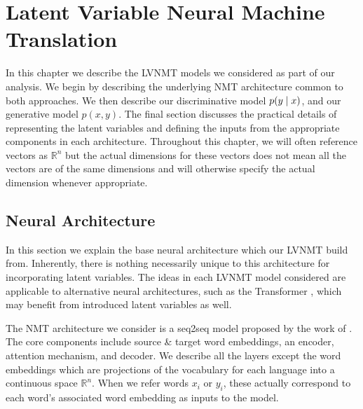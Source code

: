 \chapter{Latent Variable Neural Machine Translation}

In this chapter we describe the \ac{LVNMT} models we considered as part of our analysis. We begin by describing the underlying \ac{NMT} architecture common to both approaches. We then describe our discriminative model $p(y \; | \;{x})$, and our generative model $p(x, y)$. The final section discusses the practical details of representing the latent variables and defining the inputs from the appropriate components in each architecture. Throughout this chapter, we will often reference vectors as $\mathbb{R}^{n}$ but the actual dimensions for these vectors does not mean all the vectors are of the same dimensions and will otherwise specify the actual dimension whenever appropriate. 


\section{Neural Architecture}

In this section we explain the base neural architecture which our \ac{LVNMT} build from. Inherently, there is nothing necessarily unique to this architecture for incorporating latent variables.  The ideas in each \ac{LVNMT} model considered are applicable to alternative neural architectures, such as the Transformer \cite{vaswani2017attentionTransformer}, which may benefit from introduced latent variables as well. 

The \ac{NMT} architecture we consider is a \ac{seq2seq} model proposed by the work of  \citet{bahdanau2014NMTBYJoint}. The core components include source \& target word embeddings, an encoder, attention mechanism, and decoder. We describe all the layers except the word embeddings which are projections of the vocabulary for each language into a continuous space $\mathbb{R}^{n}$. When we refer words $x_{i}$ or $y_{i}$, these actually correspond to each word's associated word embedding as inputs to the model.  

